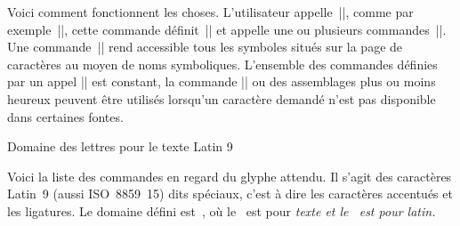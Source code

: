 Voici comment fonctionnent les choses. L'utilisateur
appelle~|\selectts|, comme par exemple~||,
cette commande définit~|\tsfont| et appelle une ou plusieurs
commandes~||. Une commande~||
rend accessible tous les symboles situés sur la page de caractères
 au moyen de noms symboliques. L'ensemble des commandes
définies par un appel || est constant, la commande
|\missingchar| ou des assemblages plus ou moins heureux peuvent être
utilisés lorsqu'un caractère demandé n'est pas disponible dans
certaines fontes.


\formalpar Domaine des lettres pour le texte Latin 9

Voici la liste des commandes en regard du glyphe attendu. Il s'agit
des caractères Latin~9 (aussi ISO~8859~15) dits spéciaux, c'est à dire
les caractères accentués et les ligatures. Le domaine défini
est~, où le~ est pour \em{texte} et le~ est pour
\em{latin}.

